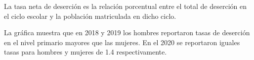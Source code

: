 La tasa neta de deserción es la relación porcentual entre el total de deserción en el ciclo escolar y la población matriculada en dicho ciclo.

La gráfica muestra que en 2018 y 2019 los hombres reportaron tasas de deserción en el nivel primario mayores que las mujeres. En el 2020 se reportaron iguales tasas para hombres y mujeres de 1.4 respectivamente. 